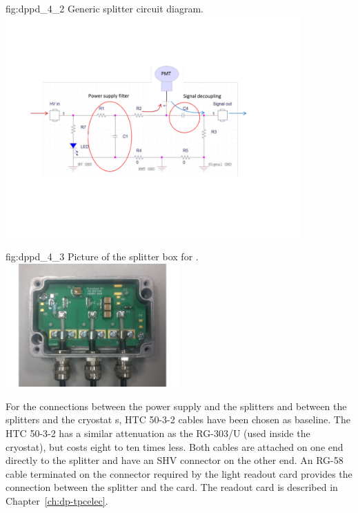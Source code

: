 \begin{dunefigure}{fig:dppd_4_2}
{Generic splitter circuit diagram.}
\includegraphics[width=0.85\textwidth]{graphics/dppd_4_2}
\end{dunefigure}

\begin{dunefigure}{fig:dppd_4_3}
{Picture of the splitter box for .}
\includegraphics[width=0.5\textwidth]{graphics/dppd_4_n3}
\end{dunefigure}

For the connections between the  power supply and the splitters and between the splitters and the cryostat \fdth{}s, HTC 50-3-2 cables have been chosen as baseline. The HTC 50-3-2 has a similar attenuation as the RG-303/U (used inside the cryostat), but costs eight to ten times less. Both cables are attached on one end directly to the  splitter and have an SHV connector on the other end. An RG-58 cable terminated on the connector required by the light readout card provides the connection between the splitter and the card. The  readout card is described in Chapter~\ref{ch:dp-tpcelec}.



